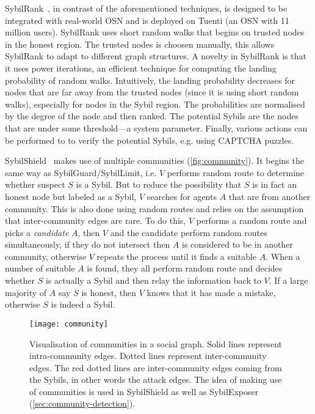 SybilRank~\cite{cao2012aiding}, in contrast of the aforementioned techniques, is
designed to be integrated with real-world OSN and is deployed on Tuenti (an OSN
with 11 million users). SybilRank uses short random walks that begins on trusted
nodes in the honest region. The trusted nodes is choosen manually, this allows
SybilRank to adapt to different graph structures. A novelty in SybilRank is that
it uses power iterations, an efficient technique for computing the landing
probability of random walks. Intuitively, the landing probability decreases for
nodes that are far away from the trusted nodes (since it is using short random
walks), especially for nodes in the Sybil region. The probabilities are
normalised by the degree of the node and then ranked. The potential Sybils are
the nodes that are under some threshold---a system parameter. Finally, various
actions can be performed to to verify the potential Sybils, e.g. using CAPTCHA
puzzles.

SybilShield~\cite{shi2013sybilshield} makes use of multiple communities
(\autoref{fig:community}). It begins the same way as
SybilGuard/SybilLimit, i.e. $V$ performs random route to determine whether
suspect $S$ is a Sybil. But to reduce the possibility that $S$ is in fact an
honest node but labeled as a Sybil, $V$ searches for agents $A$ that are from
another community. This is also done using random routes and relies on the
assumption that inter-community edges are rare. To do this, $V$ performs a
random route and picks a \emph{candidate} $A$, then $V$ and the candidate
perform random routes simultaneously, if they do not intersect then $A$ is
considered to be in another community, otherwise $V$ repeats the process until
it finds a suitable $A$. When a number of suitable $A$ is found, they all
perform random route and decides whether $S$ is actually a Sybil and then relay
the information back to $V$. If a large majority of $A$ say $S$ is honest, then
$V$ knows that it has made a mistake, otherwise $S$ is indeed a Sybil.

\begin{figure}
  \centering
  \texttt{[image: community]}
  \caption{Visualisation of communities in a social graph. Solid lines represent
    intra-community edges. Dotted lines represent inter-community edges. The red
    dotted lines are inter-community edges coming from the Sybils, in other
    words the attack edges. The idea of making use of communities is used in
    SybilShield as well as SybilExposer
    (\autoref{sec:community-detection}).}
  \label{fig:community}
\end{figure}

